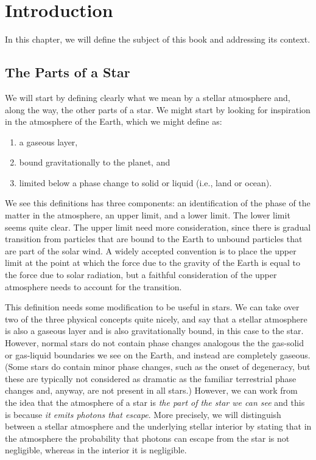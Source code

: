 \chapter{Introduction}
\label{chapter:introduction}

\noindent
In this chapter, we will define the subject of this book and addressing its context.

\newslide
\section{The Parts of a Star}

We will start by defining clearly what we mean by a stellar atmosphere and, along the way, the other parts of a star. We might start by looking for inspiration in the atmosphere of the Earth, which we might define as:
\begin{enumerate}
    \item a gaseous layer,
    \item bound gravitationally to the planet, and
    \item limited below a phase change to solid or liquid (i.e., land or ocean).
\end{enumerate}
We see this definitions has three components: an identification of the phase of the matter in the atmosphere, an upper limit, and a lower limit. The lower limit seems quite clear. The upper limit need more consideration, since there is gradual transition from particles that are bound to the Earth to unbound particles that are part of the solar wind. A widely accepted convention is to place the upper limit at the point at which the force due to the gravity of the Earth is equal to the force due to solar radiation, but a faithful consideration of the upper atmosphere needs to account for the transition.

\newslide

This definition needs some modification to be useful in stars. We can take over two of the three physical concepts quite nicely, and say that a stellar atmosphere is also a gaseous layer and is also gravitationally bound, in this case to the star. However, normal stars do not contain phase changes analogous the the gas-solid or gas-liquid boundaries we see on the Earth, and instead are completely gaseous. (Some stars do contain minor phase changes, such as the onset of degeneracy, but these are typically not considered as dramatic as the familiar terrestrial phase changes and, anyway, are not present in all stars.) However, we can work from the idea that the atmosphere of a star is \emph{the part of the star we can see} and this is because \emph{it emits photons that escape}. More precisely, we will distinguish between a stellar atmosphere and the underlying stellar interior by stating that in the atmosphere the probability that photons can escape from the star is not negligible, whereas in the interior it is negligible.

